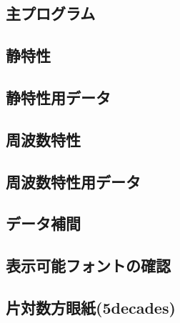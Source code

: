 \documentclass[uplatex,a4paper,11pt,oneside,openany]{jsbook}
\begin{document}
\subsection{主プログラム}



\newpage

\subsection{静特性}



\subsection{静特性用データ}



\newpage

\subsection{周波数特性}



\subsection{周波数特性用データ}



\subsection{データ補間}



\newpage

\subsection{表示可能フォントの確認}




\subsection{片対数方眼紙(5decades)}
\end{document}
